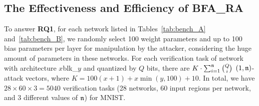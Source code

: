 


\subsection{The Effectiveness and Efficiency of {\sf BFA\_RA}}\label{sec:RQ1}
To answer \textbf{RQ1}, for each network listed in Tables~\ref{tab:bench_A} and~\ref{tab:bench_B}, we randomly select 100 weight parameters and up to 100 bias parameters per layer for manipulation by the attacker, considering the huge amount of parameters in these networks.
For each verification task of network with architecture $x$blk\_$y$ and quantized by $Q$ bits, there are $K\cdot\sum_{i=1}^{\mathfrak{n}}{Q \choose i}$ $(1,\mathfrak{n})$-attack vectors, where $K=100(x+1)+x\min(y,100)+10$. In total, we have $28\times 60\times 3=5040$ verification tasks (28 networks, 60 input regions per network, and 3 different values of $\mathfrak{n}$) for MNIST.


